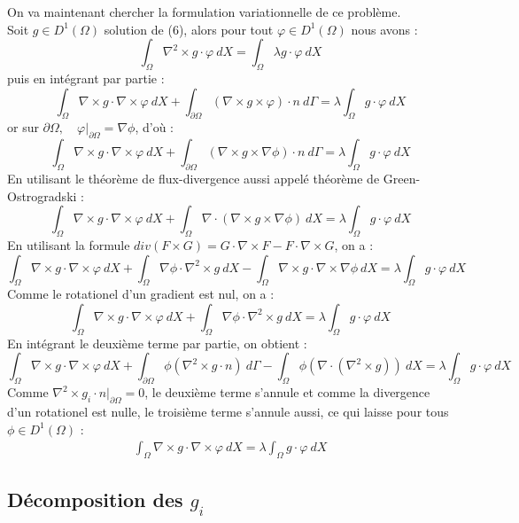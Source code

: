 On va maintenant chercher la formulation variationnelle de ce problème.\\
Soit $g\in D^1(\Omega)$ solution de (6), alors pour tout $\varphi\in D^1(\Omega)$ nous avons :
\[
\int_\Omega \nabla^2\times g\cdot\varphi\ dX = \int_\Omega\lambda g\cdot \varphi\ dX
\]
puis en intégrant par partie :
\[
\int_\Omega \nabla\times g\cdot \nabla\times\varphi\ dX + \int_{\partial\Omega} (\nabla\times g\times \varphi)\cdot n\ d\Gamma = \lambda\int_\Omega g\cdot \varphi\ dX
\]
or sur $\partial\Omega,\quad \varphi\big\rvert_{\partial\Omega}=\nabla\phi$, d'où : 
\[
\int_\Omega \nabla\times g\cdot \nabla\times\varphi\ dX + \int_{\partial\Omega} (\nabla\times g\times \nabla\phi)\cdot n\ d\Gamma = \lambda\int_\Omega g\cdot \varphi\ dX
\]
En utilisant le théorème de flux-divergence aussi appelé théorème de Green-Ostrogradski :
\[
\int_\Omega \nabla\times g\cdot \nabla\times\varphi\ dX + \int_\Omega \nabla\cdot(\nabla\times g\times \nabla\phi)\ dX = \lambda\int_\Omega g\cdot \varphi\ dX
\]
En utilisant la formule $div(F\times G) = G\cdot \nabla\times F - F\cdot \nabla\times G$, on a :
\[
\int_\Omega \nabla\times g\cdot \nabla\times\varphi\ dX + \int_\Omega \nabla\phi\cdot \nabla^2\times g\ dX -\int_\Omega \nabla\times g\cdot \nabla\times\nabla\phi\ dX  = \lambda\int_\Omega g\cdot \varphi\ dX
\]
Comme le rotationel d'un gradient est nul, on a :
\[
\int_\Omega \nabla\times g\cdot \nabla\times\varphi\ dX + \int_\Omega \nabla\phi\cdot \nabla^2\times g\ dX  = \lambda\int_\Omega g\cdot \varphi\ dX
\]
En intégrant le deuxième terme par partie, on obtient : 
\[
\int_\Omega \nabla\times g\cdot \nabla\times\varphi\ dX + \int_{\partial\Omega} \phi(\nabla^2\times g\cdot n)\ d\Gamma - \int_\Omega \phi(\nabla\cdot(\nabla^2\times g))\ dX  = \lambda\int_\Omega g\cdot \varphi\ dX
\]
Comme $\nabla^2\times  g_i\cdot n\big\rvert_{\partial\Omega} = 0$, le deuxième terme s'annule et comme la divergence d'un rotationel est nulle, le troisième terme s'annule aussi, ce qui laisse pour tous $\phi\in D^1(\Omega)$ :
\begin{eqnarray}
\label{fveigen}
\int_\Omega \nabla\times g\cdot \nabla\times\varphi\ dX = \lambda\int_\Omega g\cdot \varphi\ dX
\end{eqnarray}

\subsection{Décomposition des $g_i$}
\label{decomp}

